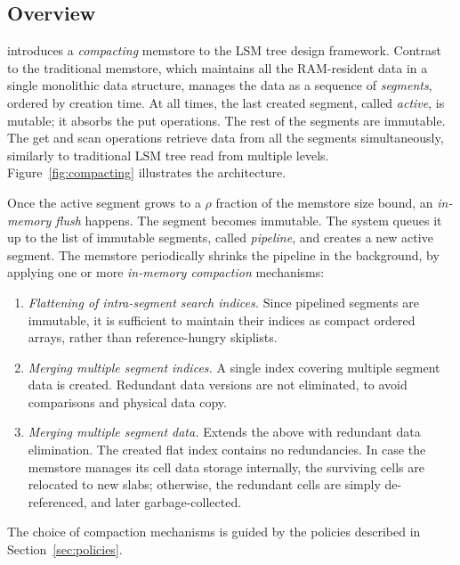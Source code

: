 \subsection{Overview}

\begin{figure*}
\caption{\bf{LSM architecture based on compacting memstore.}}
\label{fig:compacting}
\end{figure*}

\sys\/ introduces a {\em compacting\/} memstore to the LSM tree design framework. Contrast to the traditional memstore, 
which maintains all the RAM-resident data in a single monolithic data structure, \sys\/ manages the data as a sequence of 
{\em segments}, ordered by creation time. At all times, the last created segment, called {\em active}, is mutable; it absorbs 
the put operations. The rest of the segments are immutable. The get and scan operations retrieve data from all the segments 
simultaneously, similarly to traditional LSM tree read from multiple levels. Figure~\ref{fig:compacting} illustrates the architecture. 

Once the active segment grows to a $\rho$ fraction of the memstore size bound, an {\em in-memory flush} happens.
The segment becomes immutable. The system queues it up to the list of immutable segments, called {\em pipeline}, 
and creates a new active segment. The  memstore periodically shrinks the pipeline in the background, by applying 
one or more {\em in-memory compaction} mechanisms: 
\begin{enumerate}
\item {\em Flattening of intra-segment search indices.} Since pipelined segments are immutable, it is sufficient to maintain 
their indices as compact ordered arrays, rather than reference-hungry skiplists.  
\item {\em Merging multiple segment indices.} A single index covering multiple segment data is created. Redundant data 
versions are not eliminated, to avoid comparisons and physical data copy. 
\item  {\em Merging multiple segment data.} Extends the above with redundant data elimination. The created flat index 
contains no redundancies. In case the memstore manages its cell data storage internally, the surviving cells are relocated
to new slabs; otherwise, the redundant cells are simply de-referenced, and later garbage-collected.    
\end{enumerate} 
The choice of compaction mechanisms is guided by the policies described in Section~\ref{sec:policies}. 

